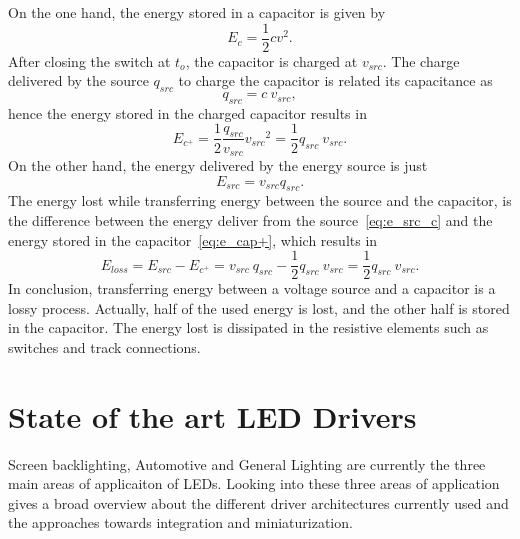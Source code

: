 On the one hand, the energy stored in a capacitor is given by
\begin{equation}
E_c = \frac{1}{2} c v^2.
\label{eq:e_cap}
\end{equation}
After closing the switch at $t_o$, the capacitor is charged at $v_{src}$.  The charge delivered by the source $q_{src}$ to charge the capacitor is related its capacitance as
\begin{equation}
q_{src}= c~v_{src},
\label{eq:q_src_cap}
\end{equation}
hence the energy stored in the charged capacitor results in  
\begin{equation}
E_{c^+} = \frac{1}{2} \frac{q_{src}}{v_{src}}  {v_{src}}^2 = \frac{1}{2}q_{src}~v_{src}.
\label{eq:e_cap+}
\end{equation}
On the other hand, the energy delivered by the energy source is just 
\begin{equation}
E_{src} = v_{src} q_{src}.
\label{eq:e_src_c}
\end{equation}
The energy lost while transferring energy between the source and the capacitor, is the difference between the energy deliver from the source~\eqref{eq:e_src_c} and the energy stored in the capacitor~\eqref{eq:e_cap+}, which results in
\begin{equation}
E_{loss} = E_{src} - E_{c^+} = v_{src}~q_{src}  - \frac{1}{2}q_{src}~v_{src}  = \frac{1}{2}q_{src}~v_{src}.
\label{eq:e_loss_l}
\end{equation}
In conclusion, transferring energy between a voltage source and a capacitor is a lossy process. Actually, half of the used energy is lost, and the other half is stored in the capacitor. The energy lost is dissipated in the resistive elements such as switches and  track connections.

\section{State of the art LED Drivers}
Screen backlighting, Automotive and General Lighting are currently the three main areas of applicaiton of LEDs. Looking into these three areas of application gives a broad overview about the different driver architectures currently used and the approaches towards integration and miniaturization.

